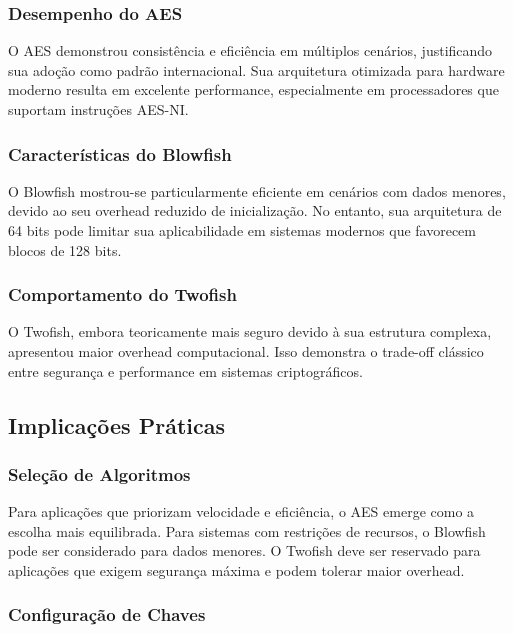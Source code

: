 \documentclass[12pt,a4paper,oneside]{article}
\begin{document}
\subsubsection{Desempenho do AES}

O AES demonstrou consistência e eficiência em múltiplos cenários, justificando sua adoção como padrão internacional. Sua arquitetura otimizada para hardware moderno resulta em excelente performance, especialmente em processadores que suportam instruções AES-NI.

\subsubsection{Características do Blowfish}

O Blowfish mostrou-se particularmente eficiente em cenários com dados menores, devido ao seu overhead reduzido de inicialização. No entanto, sua arquitetura de 64 bits pode limitar sua aplicabilidade em sistemas modernos que favorecem blocos de 128 bits.

\subsubsection{Comportamento do Twofish}

O Twofish, embora teoricamente mais seguro devido à sua estrutura complexa, apresentou maior overhead computacional. Isso demonstra o trade-off clássico entre segurança e performance em sistemas criptográficos.

\subsection{Implicações Práticas}

\subsubsection{Seleção de Algoritmos}

Para aplicações que priorizam velocidade e eficiência, o AES emerge como a escolha mais equilibrada. Para sistemas com restrições de recursos, o Blowfish pode ser considerado para dados menores. O Twofish deve ser reservado para aplicações que exigem segurança máxima e podem tolerar maior overhead.

\subsubsection{Configuração de Chaves}
\end{document}
